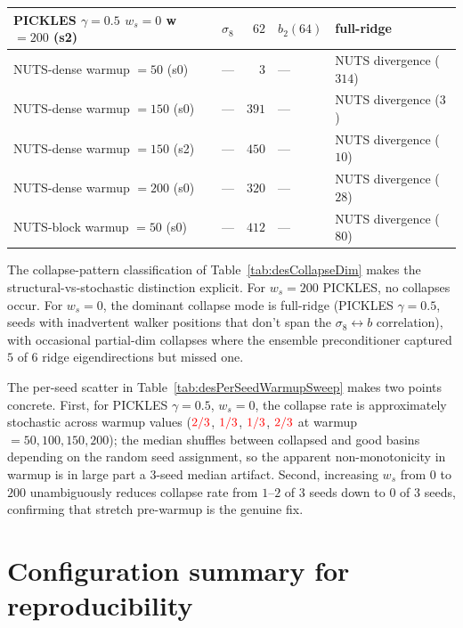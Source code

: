 \documentclass{article}
\begin{document}
\begin{table}[h]
\begin{tabular}{l l r l l}
PICKLES $\gamma{=}0.5$ $w_s{=}0$ w$=200$ (s2)                 & $\sigma_8$ & $62$  & $b_2(64)$ & full-ridge\\
\midrule
NUTS-dense warmup $=50$ (s0)                                   & --- & $3$ & --- & NUTS divergence ($314$)\\
NUTS-dense warmup $=150$ (s0)                                  & --- & $391$ & --- & NUTS divergence ($3$)\\
NUTS-dense warmup $=150$ (s2)                                  & --- & $450$ & --- & NUTS divergence ($10$)\\
NUTS-dense warmup $=200$ (s0)                                  & --- & $320$ & --- & NUTS divergence ($28$)\\
NUTS-block warmup $=50$ (s0)                                   & --- & $412$ & --- & NUTS divergence ($80$)\\
\bottomrule
\end{tabular}
\end{table}

The collapse-pattern classification of Table~\ref{tab:desCollapseDim}
makes the structural-vs-stochastic distinction explicit.  For
$w_s=200$ PICKLES, no collapses occur.  For $w_s=0$, the dominant
collapse mode is full-ridge (PICKLES $\gamma=0.5$, seeds with
inadvertent walker positions that don't span the $\sigma_8\!\leftrightarrow\!b$
correlation), with occasional partial-dim collapses where the
ensemble preconditioner captured $5$ of $6$ ridge eigendirections but
missed one.

The per-seed scatter in Table~\ref{tab:desPerSeedWarmupSweep} makes
two points concrete.  First, for PICKLES $\gamma=0.5$, $w_s=0$, the
collapse rate is approximately stochastic across warmup values
($\textcolor{red}{2/3}$, $\textcolor{red}{1/3}$, $\textcolor{red}{1/3}$,
$\textcolor{red}{2/3}$ at warmup $=50, 100, 150, 200$); the median
shuffles between collapsed and good basins depending on the random
seed assignment, so the apparent non-monotonicity in warmup is in
large part a $3$-seed median artifact.  Second, increasing $w_s$ from
$0$ to $200$ unambiguously reduces collapse rate from $1$--$2$ of $3$
seeds down to $0$ of $3$ seeds, confirming that stretch pre-warmup
is the genuine fix.

\section{Configuration summary for reproducibility}
\label{app:desConfig}
\end{document}
